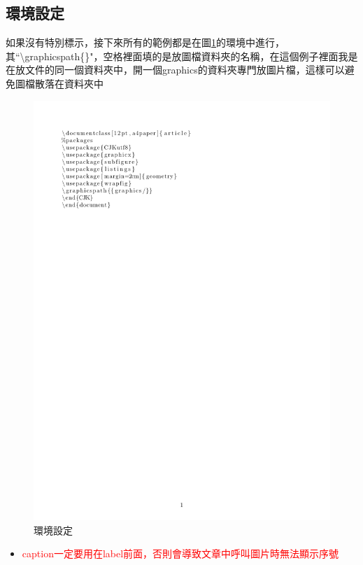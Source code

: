 \documentclass[12pt,a4paper]{report}
\begin{document}
\begin{CJK}{UTF8}{bkai}
\section{環境設定}
\noindent 如果沒有特別標示，接下來所有的範例都是在圖\ref{ES}的環境中進行，其``\textbackslash graphicspath\{\}"，空格裡面填的是放圖檔資料夾的名稱，在這個例子裡面我是在放文件的同一個資料夾中，開一個graphics的資料夾專門放圖片檔，這樣可以避免圖檔散落在資料夾中
\begin{figure}[!h]
\centering
\includegraphics[scale=0.8]{./pics/setting.pdf}
\caption[es]{環境設定}
\label{ES}
\end{figure}
\begin{itemize}
\item \textcolor{red}{caption一定要用在label前面，否則會導致文章中呼叫圖片時無法顯示序號}
\end{itemize}



\end{CJK}
\end{document}

